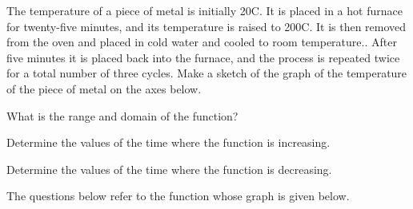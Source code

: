 \begin{problem}
\item The temperature of a piece of metal is initially 20C. It is
  placed in a hot furnace for twenty-five minutes, and its temperature
  is raised to 200C. It is then removed from the oven and placed in
  cold water and cooled to room temperature.. After five minutes it is
  placed back into the furnace, and the process is repeated twice for
  a total number of three cycles. Make a sketch of the graph of the
  temperature of the piece of metal on the axes below.

    \hspace{-7em}

      \begin{subproblem}
      \item What is the range and domain of the function?
        \vfill
      \item Determine the values of the time where the function is
        increasing.
        \vfill
      \item Determine the values of the time where the function is
        decreasing.  
        \vfill
      \end{subproblem}

      \clearpage
\item The questions below refer to the function whose graph is given
  below.


\end{problem}
